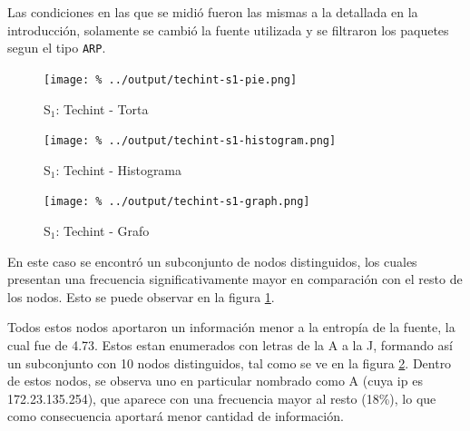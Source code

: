 \documentclass[final,inline,a4paper,narroweqnarray]{ieee}
\begin{document}
  Las condiciones en las que se midió fueron las mismas a la detallada
  en la introducción, solamente se cambió la fuente utilizada y se
  filtraron los paquetes segun el tipo \texttt{ARP}.

    \begin{figure}[ht]\begin{center}
      \texttt{[image: \%
      ../output/techint-s1-pie.png]}
      \vspace{-2em}
      \caption{S$_1$: Techint - Torta}
      \label{techint-s1-pie}
    \end{center}\end{figure}

    \begin{figure}[ht]\begin{center}
      \texttt{[image: \%
      ../output/techint-s1-histogram.png]}
      \vspace{-2em}
      \caption{S$_1$: Techint - Histograma}
      \label{techint-s1-histogram}
    \end{center}\end{figure}

    \begin{figure}[H]\begin{center}
      \texttt{[image: \%
      ../output/techint-s1-graph.png]}
      \vspace{-2em}
      \caption{S$_1$: Techint - Grafo}
      \label{techint-s1-graph}
    \end{center}\end{figure}


  En este caso se encontró un subconjunto de nodos distinguidos, los
  cuales presentan una frecuencia significativamente mayor en
  comparación con el resto de los nodos. Esto se puede observar en la
  figura \ref{techint-s1-pie}.

  Todos estos nodos aportaron un información menor a la entropía de la
  fuente, la cual fue de 4.73. Estos estan enumerados con letras de la A a
  la J, formando así un subconjunto con 10 nodos distinguidos, tal como se
  ve en la figura \ref{techint-s1-histogram}. Dentro de estos nodos, se
  observa uno en particular nombrado como A (cuya ip es 172.23.135.254), que
  aparece con una frecuencia mayor al resto (18\%), lo que como consecuencia
  aportará menor cantidad de información.
\end{document}
